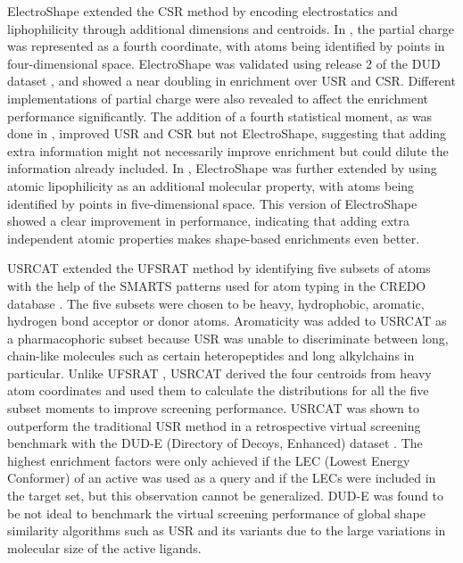 ElectroShape \citep{1337,1338} extended the CSR \citep{1334} method by encoding electrostatics and liphophilicity through additional dimensions and centroids. In \citep{1337}, the partial charge was represented as a fourth coordinate, with atoms being identified by points in four-dimensional space. ElectroShape was validated using release 2 of the DUD dataset \citep{87}, and showed a near doubling in enrichment over USR and CSR. Different implementations of partial charge were also revealed to affect the enrichment performance significantly. The addition of a fourth statistical moment, as was done in \citep{1333}, improved USR and CSR but not ElectroShape, suggesting that adding extra information might not necessarily improve enrichment but could dilute the information already included. In \citep{1338}, ElectroShape was further extended by using atomic lipophilicity as an additional molecular property, with atoms being identified by points in five-dimensional space. This version of ElectroShape showed a clear improvement in performance, indicating that adding extra independent atomic properties makes shape-based enrichments even better.

USRCAT \citep{1331} extended the UFSRAT \citep{1436} method by identifying five subsets of atoms with the help of the SMARTS patterns used for atom typing in the CREDO database \citep{522,1530}. The five subsets were chosen to be heavy, hydrophobic, aromatic, hydrogen bond acceptor or donor atoms. Aromaticity was added to USRCAT as a pharmacophoric subset because USR was unable to discriminate between long, chain-like molecules such as certain heteropeptides and long alkylchains in particular. Unlike UFSRAT \citep{1436}, USRCAT \citep{1331} derived the four centroids from heavy atom coordinates and used them to calculate the distributions for all the five subset moments to improve screening performance. USRCAT was shown to outperform the traditional USR method in a retrospective virtual screening benchmark with the DUD-E (Directory of Decoys, Enhanced) dataset \citep{1185}. The highest enrichment factors were only achieved if the LEC (Lowest Energy Conformer) of an active was used as a query and if the LECs were included in the target set, but this observation cannot be generalized. DUD-E was found to be not ideal to benchmark the virtual screening performance of global shape similarity algorithms such as USR and its variants due to the large variations in molecular size of the active ligands.

